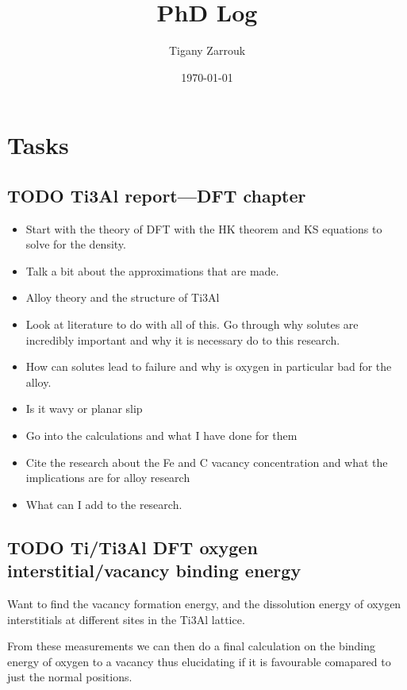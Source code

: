 \documentclass[11pt]{article}
\author{Tigany Zarrouk}
\date{\today}
\title{PhD Log}
\begin{document}
\maketitle
\tableofcontents





\section{Tasks}
\label{sec:org27c6bbe}


\subsection{{\bfseries\sffamily TODO} Ti3Al report---DFT chapter}
\label{sec:orgd6e0e7b}
\begin{itemize}
\item Start with the theory of DFT with the HK theorem and KS equations to solve
for the density.
\item Talk a bit about the approximations that are made.
\item Alloy theory and the structure of Ti3Al
\item Look at literature to do with all of this. Go through why solutes are
incredibly important and why it is necessary do to this research.
\item How can solutes lead to failure and why is oxygen in particular bad for the alloy.
\item Is it wavy or planar slip
\item Go into the calculations and what I have done for them
\item Cite the research about the Fe and C vacancy concentration and what the
implications are for alloy research
\item What can I add to the research.
\end{itemize}
\subsection{{\bfseries\sffamily TODO} Ti/Ti3Al DFT oxygen interstitial/vacancy binding energy}
\label{sec:orge5f3942}
Want to find the vacancy formation energy, and the dissolution energy of
oxygen interstitials at different sites in the Ti3Al lattice. 

From these measurements we can then do a final calculation on the binding
energy of oxygen to a vacancy thus elucidating if it is favourable comapared
to just the normal positions. 
\end{document}
